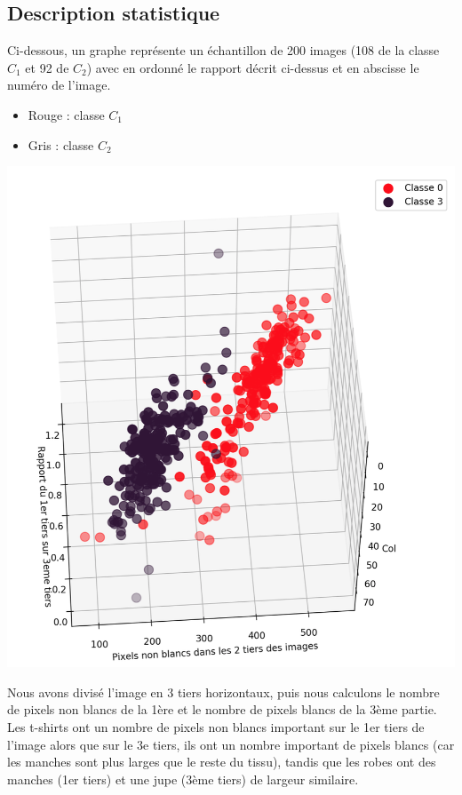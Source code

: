 \documentclass[a4paper,10pt]{article}
\begin{document}
	\subsection{Description statistique}
		\begin{minipage}{0.55\linewidth}
			Ci-dessous, un graphe représente un échantillon de 200 images (108 de la classe $C_1$ et 92 de $C_2$) avec en ordonné le rapport décrit ci-dessus et en abscisse le numéro de l'image. 
			\begin{itemize}
				\item Rouge : classe $C_1$
				\item Gris : classe $C_2$
			\end{itemize}
		\end{minipage}\hfill
		\begin{minipage}{0.4\linewidth}
			\includegraphics[scale = 0.2]{fichiers/rapport.PNG}
		\end{minipage}\hfill
		\begin{minipage}{0.55\linewidth}
			Nous avons divisé l’image en 3 tiers horizontaux, puis nous calculons le nombre de pixels non blancs de la 1ère et le nombre de pixels blancs de la 3ème partie. Les t-shirts ont un nombre de pixels non blancs important sur le 1er tiers de l'image alors que sur le 3e tiers, ils ont un nombre important de pixels blancs (car les manches sont plus larges que le reste du tissu), tandis que les robes ont des manches (1er tiers) et une jupe (3ème tiers) de largeur similaire. 
		\end{minipage}\hfill
\end{document}
